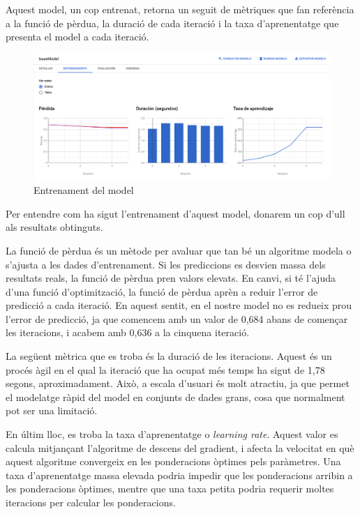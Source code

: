 \documentclass[12pt,longbibliography]{article}
\theoremstyle{definition}
\theoremstyle{remark}
\begin{document}
Aquest model, un cop entrenat, retorna un seguit de mètriques que fan referència a la funció de pèrdua, la duració de cada iteració i la taxa d'aprenentatge que presenta el model a cada iteració.


\begin{figure}[H]
\begin{center}
\includegraphics[width=12.5cm]{log1}
\end{center}
\caption{Entrenament del model}
\label{fig:log1}
\end{figure}


Per entendre com ha sigut l'entrenament d'aquest model, donarem un cop d'ull als resultats obtinguts.



La funció de pèrdua és un mètode per avaluar que tan bé un algoritme modela o s'ajusta a les dades d'entrenament. Si les prediccions es desvien massa dels resultats reals, la funció de pèrdua pren valors elevats. En canvi, si té l'ajuda d'una funció d'optimització, la funció de pèrdua aprèn a reduir l'error de predicció a cada iteració. En aquest sentit, en el nostre model no es redueix prou l'error de predicció, ja que comencem amb un valor de 0,684 abans de començar les iteracions, i acabem amb 0,636 a la cinquena iteració.



La següent mètrica que es troba és la duració de les iteracions. Aquest és un procés àgil en el qual la iteració que ha ocupat més temps ha sigut de 1,78 segons, aproximadament. Això, a escala d'usuari és molt atractiu, ja que permet el modelatge ràpid del model en conjunts de dades grans, cosa que normalment pot ser una limitació.



En últim lloc, es troba la taxa d'aprenentatge o \emph{learning rate}. Aquest valor es calcula mitjançant l'algoritme de descens del gradient, i afecta la velocitat en què aquest algoritme convergeix en les ponderacions òptimes pels paràmetres. Una taxa d'aprenentatge massa elevada podria impedir que les ponderacions arribin a les ponderacions òptimes, mentre que una taxa petita podria requerir moltes iteracions per calcular les ponderacions.
\end{document}
